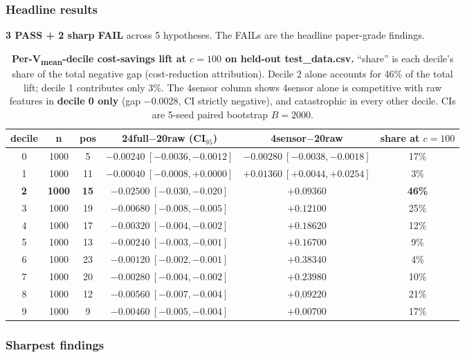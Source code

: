 \documentclass{article}
\begin{document}
\subsubsection{Headline results}\label{sec:p8-iter204-results}
\textbf{3 PASS + 2 sharp FAIL} across 5 hypotheses. The FAILs are the
headline paper-grade findings.

\begin{table}[h]
\centering
\small
\begin{tabular}{cccccc}
\hline
decile & n & pos & 24full$-$20raw (CI$_{95}$) & 4sensor$-$20raw & share at $c{=}100$ \\
\hline
0 & 1000 &  5 & $-0.00240\ [-0.0036,-0.0012]$ & $\mathbf{-0.00280\ [-0.0038,-0.0018]}$ &  17\% \\
1 & 1000 & 11 & $-0.00040\ [-0.0008,+0.0000]$ & $+0.01360\ [+0.0044,+0.0254]$ &   3\% \\
\textbf{2} & \textbf{1000} & \textbf{15} & $\mathbf{-0.02500\ [-0.030,-0.020]}$ & $+0.09360$ & \textbf{46\%} \\
3 & 1000 & 19 & $-0.00680\ [-0.008,-0.005]$ & $+0.12100$ & 25\% \\
4 & 1000 & 17 & $-0.00320\ [-0.004,-0.002]$ & $+0.18620$ & 12\% \\
5 & 1000 & 13 & $-0.00240\ [-0.003,-0.001]$ & $+0.16700$ &  9\% \\
6 & 1000 & 23 & $-0.00120\ [-0.002,-0.001]$ & $+0.38340$ &  4\% \\
7 & 1000 & 20 & $-0.00280\ [-0.004,-0.002]$ & $+0.23980$ & 10\% \\
8 & 1000 & 12 & $-0.00560\ [-0.007,-0.004]$ & $+0.09220$ & 21\% \\
9 & 1000 &  9 & $-0.00460\ [-0.005,-0.004]$ & $+0.00700$ & 17\% \\
\hline
\end{tabular}
\caption{\textbf{Per-V\textsubscript{mean}-decile cost-savings lift at
$c{=}100$ on held-out test\_data.csv.} ``share'' is each decile's share
of the total negative gap (cost-reduction attribution). Decile 2 alone
accounts for 46\% of the total lift; decile 1 contributes only 3\%. The
4sensor column shows 4sensor alone is competitive with raw features in
\textbf{decile 0 only} (gap $-0.0028$, CI strictly negative), and
catastrophic in every other decile. CIs are 5-seed paired bootstrap
$B{=}2000$.}
\label{tab:p8-iter204-decile-cost}
\end{table}

\subsubsection{Sharpest findings}\label{sec:p8-iter204-findings}
\end{document}
